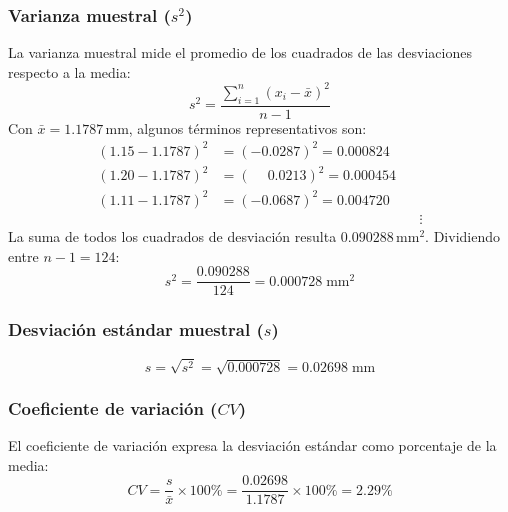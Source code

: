 \resultado[$R$ -- Rango]{\[ R = 0.14\;\text{mm} \]}

\subsubsection*{Varianza muestral ($s^2$)}

La varianza muestral mide el promedio de los cuadrados de las desviaciones
respecto a la media:
\[
s^2 = \frac{\displaystyle\sum_{i=1}^{n}(x_i - \bar{x})^2}{n-1}
\]
Con $\bar{x} = 1.1787$\,mm, algunos t\'erminos representativos son:
\begin{align*}
(1.15 - 1.1787)^2 &= (-0.0287)^2 = 0.000824 \\
(1.20 - 1.1787)^2 &= (\phantom{-}0.0213)^2 = 0.000454 \\
(1.11 - 1.1787)^2 &= (-0.0687)^2 = 0.004720 \\[-2pt]
                   &\hspace{6cm}\vdots
\end{align*}
La suma de todos los cuadrados de desviaci\'on resulta $0.090288$\,mm$^2$.
Dividiendo entre $n-1 = 124$:
\[
s^2 = \frac{0.090288}{124} = 0.000728\;\text{mm}^2
\]

\resultado[$s^2$ -- Varianza]{\[ s^2 = 0.000728\;\text{mm}^2 \]}

\subsubsection*{Desviaci\'on est\'andar muestral ($s$)}

\[
s = \sqrt{s^2} = \sqrt{0.000728} = 0.02698\;\text{mm}
\]


\subsubsection*{Coeficiente de variaci\'on ($CV$)}

El coeficiente de variaci\'on expresa la desviaci\'on est\'andar como porcentaje
de la media:
\[
CV = \frac{s}{\bar{x}} \times 100\%
   = \frac{0.02698}{1.1787} \times 100\% = 2.29\%
\]



